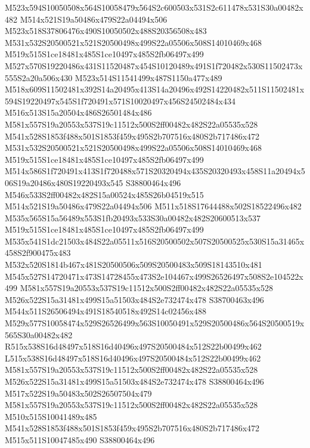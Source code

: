 \documentclass{article}
\begin{document}
\begin{multicols}{2}
M523x594S10050508x564S10058479x564S2c600503x531S2c611478x531S30a00482x482 M514x521S19a50486x479S22a04494x506 M523x518S37806476x490S10050502x488S20356508x483 M531x532S20500521x521S20500498x499S22a05506x508S14010469x468 M519x515S1ce18481x485S1ce10497x485S2fb06497x499 M527x570S19220486x431S11520487x454S10120489x491S1f720482x530S11502473x555S2a20a506x430 M523x514S11541499x487S1150a477x489 M518x609S11502481x392S14a20495x413S14a20496x492S14220482x511S11502481x594S19220497x545S1f720491x571S10020497x456S24502484x434 M516x513S15a20504x486S26501484x486 M581x557S19a20553x537S19c11512x500S2ff00482x482S22a05535x528 M541x528S1853f488x501S1853f459x495S2b707516x480S2b717486x472 M531x532S20500521x521S20500498x499S22a05506x508S14010469x468 M519x515S1ce18481x485S1ce10497x485S2fb06497x499 M514x586S1f720491x413S1f720488x571S20320494x435S20320493x458S11a20494x506S19a20486x480S19220493x545 S38800464x496 M546x533S2ff00482x482S15a00524x485S26b04519x515 M514x521S19a50486x479S22a04494x506 M511x518S17644488x502S18522496x482 M535x565S15a56489x553S1fb20493x533S30a00482x482S20600513x537 M519x515S1ce18481x485S1ce10497x485S2fb06497x499 M535x541S1dc21503x484S22a05511x516S20500502x507S20500525x530S15a31465x458S2f900475x483 M532x520S1814b467x481S20500506x509S20500483x509S18143510x481 M545x527S14720471x473S14728455x473S2e104467x499S26526497x508S2e104522x499 M581x557S19a20553x537S19c11512x500S2ff00482x482S22a05535x528 M526x522S15a31481x499S15a51503x484S2e732474x478 S38700463x496 M544x511S26506494x491S18540518x492S14c02456x488 M529x577S10058474x529S26526499x563S10050491x529S20500486x564S20500519x565S30a00482x482 R515x538S16d48497x518S16d40496x497S20500484x512S22b00499x462 L515x538S16d48497x518S16d40496x497S20500484x512S22b00499x462 M581x557S19a20553x537S19c11512x500S2ff00482x482S22a05535x528 M526x522S15a31481x499S15a51503x484S2e732474x478 S38800464x496 M517x522S19a50483x502S26507504x479 M581x557S19a20553x537S19c11512x500S2ff00482x482S22a05535x528 M510x515S10041489x485 M541x528S1853f488x501S1853f459x495S2b707516x480S2b717486x472 M515x511S10047485x490 S38800464x496



\end{multicols}
\end{document}
